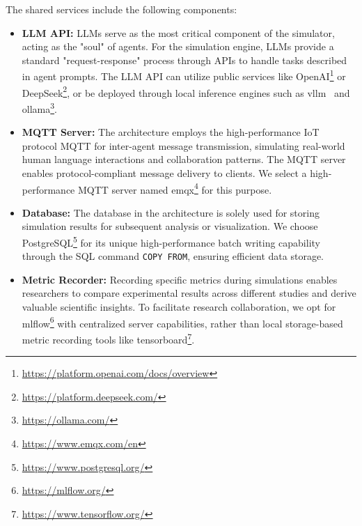 The shared services include the following components:
\begin{itemize}
    \item \textbf{LLM API:}
    LLMs serve as the most critical component of the simulator, acting as the "soul" of agents.
    For the simulation engine, LLMs provide a standard "request-response" process through APIs to handle tasks described in agent prompts.
    The LLM API can utilize public services like OpenAI\footnote{\url{https://platform.openai.com/docs/overview}} or DeepSeek\footnote{\url{https://platform.deepseek.com/}}, or be deployed through local inference engines such as vllm~\cite{kwon2023efficient} and ollama\footnote{\url{https://ollama.com/}}.
    \item \textbf{MQTT Server:}
    The architecture employs the high-performance IoT protocol MQTT for inter-agent message transmission, simulating real-world human language interactions and collaboration patterns.
    The MQTT server enables protocol-compliant message delivery to clients.
    We select a high-performance MQTT server named emqx\footnote{\url{https://www.emqx.com/en}} for this purpose.
    \item \textbf{Database:}
    The database in the architecture is solely used for storing simulation results for subsequent analysis or visualization.
    We choose PostgreSQL\footnote{\url{https://www.postgresql.org/}} for its unique high-performance batch writing capability through the SQL command \texttt{COPY FROM}, ensuring efficient data storage.
    \item \textbf{Metric Recorder:}
    Recording specific metrics during simulations enables researchers to compare experimental results across different studies and derive valuable scientific insights.
    To facilitate research collaboration, we opt for mlflow\footnote{\url{https://mlflow.org/}} with centralized server capabilities, rather than local storage-based metric recording tools like tensorboard\footnote{\url{https://www.tensorflow.org/}}.
\end{itemize}

